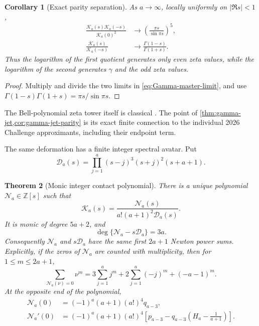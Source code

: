 \documentclass[11pt]{article}
\newtheorem{theorem}{Theorem}[section]
\newtheorem{corollary}[theorem]{Corollary}
\theoremstyle{definition}
\theoremstyle{remark}
\newcommand{\Z}{\mathbb Z}
\begin{document}
\begin{corollary}[Exact parity separation]
\label{cor:gamma-jet-parity}
As \(a\to\infty\), locally uniformly on \(|\Re s|<1\),
\begin{align}
 \frac{\mathscr K_a(s)\mathscr K_a(-s)}{\mathscr K_a(0)^2}
 &\longrightarrow
 \left(\frac{\pi s}{\sin\pi s}\right)^5,
 \label{eq:even-jet-limit}\\
 \frac{\mathscr K_a(s)}{\mathscr K_a(-s)}
 &\longrightarrow\frac{\Gamma(1-s)}{\Gamma(1+s)}.
 \label{eq:odd-jet-limit}
\end{align}
Thus the logarithm of the first quotient generates only even zeta values,
while the logarithm of the second generates \(\gamma\) and the odd zeta
values.
\end{corollary}

\begin{proof}
Multiply and divide the two limits in \eqref{eq:Gamma-master-limit}, and use
\(\Gamma(1-s)\Gamma(1+s)=\pi s/\sin\pi s\).
\end{proof}

The Bell-polynomial zeta tower itself is classical
\cite{PilehroodBell2012}.  The point of
\cref{thm:gamma-jet,cor:gamma-jet-parity} is its exact finite connection to
the individual 2026 Challenge approximants, including their endpoint term.

The same deformation has a finite integer spectral avatar.  Put
\begin{equation}\label{eq:contact-denominator}
 \mathscr D_a(s)=
 \prod_{j=1}^a(s-j)^3(s+j)^2(s+a+1).
\end{equation}

\begin{theorem}[Monic integer contact polynomial]
\label{thm:contact-polynomial}
There is a unique polynomial \(\mathscr N_a\in\Z[s]\) such that
\begin{equation}\label{eq:contact-rational-form}
 \mathscr K_a(s)=
 \frac{\mathscr N_a(s)}{a!(a+1)^2\mathscr D_a(s)}.
\end{equation}
It is monic of degree \(5a+2\), and
\begin{equation}\label{eq:contact-degree}
 \deg\{\mathscr N_a-s\mathscr D_a\}=3a.
\end{equation}
Consequently \(\mathscr N_a\) and \(s\mathscr D_a\) have the same first
\(2a+1\) Newton power sums.  Explicitly, if the zeros of
\(\mathscr N_a\) are counted with multiplicity, then for
\(1\le m\le2a+1\),
\begin{equation}\label{eq:contact-Newton}
 \sum_{\mathscr N_a(\nu)=0}\nu^m
 =3\sum_{j=1}^aj^m+2\sum_{j=1}^a(-j)^m+(-a-1)^m.
\end{equation}
At the opposite end of the polynomial,
\begin{align}
 \mathscr N_a(0)
 &=(-1)^a(a+1)(a!)^4q_{a-3},
 \label{eq:contact-N0}\\
 \mathscr N_a'(0)
 &=(-1)^a(a+1)(a!)^4
 \left[p_{a-3}-q_{a-3}\left(H_a-\frac1{a+1}\right)\right].
 \label{eq:contact-N1}
\end{align}
\end{theorem}
\end{document}
